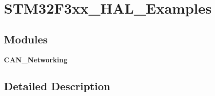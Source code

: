 \section{S\+T\+M32\+F3xx\+\_\+\+H\+A\+L\+\_\+\+Examples}
\label{group___s_t_m32_f3xx___h_a_l___examples}
\subsection*{Modules}
\begin{DoxyCompactItemize}
\item 
\textbf{ C\+A\+N\+\_\+\+Networking}
\end{DoxyCompactItemize}


\subsection{Detailed Description}
